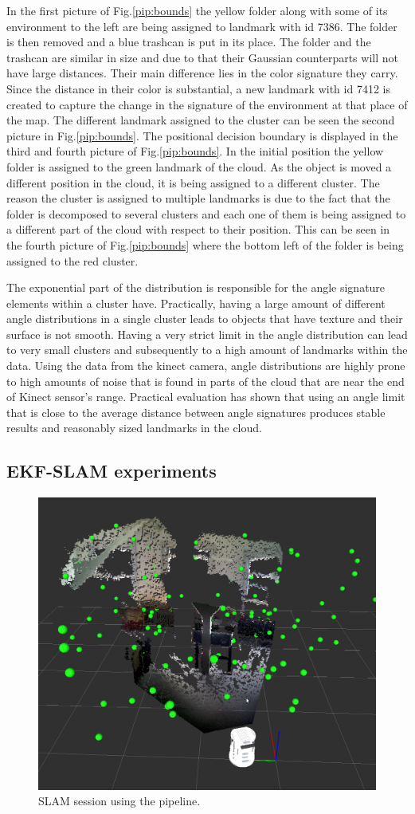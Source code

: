 \documentclass[twoside,hidelinks]{article}
\begin{document}
In the first picture of Fig.\ref{pip:bounds} the yellow folder along with some of its environment to the left are being assigned to landmark with id 7386. The folder is then removed and a blue trashcan is put in its place. The folder and the trashcan are similar in size and due to that their Gaussian counterparts will not have large distances. Their main difference lies in the color signature they carry. Since the distance in their color is substantial, a new landmark with id 7412 is created to capture the change in the signature of the environment at that place of the map. The different landmark assigned to the cluster can be seen the second picture in Fig.\ref{pip:bounds}. The positional decision boundary is displayed in the third and fourth picture of Fig.\ref{pip:bounds}. In the initial position the yellow folder is assigned to the green landmark of the cloud. As the object is moved a different position in the cloud, it is being assigned to a different cluster. The reason the cluster is assigned to multiple landmarks is due to the fact that the folder is decomposed to several clusters and each one of them is being assigned to a different part of the cloud with respect to their position. This can be seen in the fourth picture of Fig.\ref{pip:bounds} where the bottom left of the folder is being assigned to the red cluster.

The exponential part of the distribution is responsible for the angle signature elements within a cluster have. Practically, having a large amount of different angle distributions in a single cluster leads to objects that have texture and their surface is not smooth. Having a very strict limit in the angle distribution can lead to very small clusters and subsequently to a high amount of landmarks within the data. Using the data from the kinect camera, angle distributions are highly prone to high amounts of noise that is found in parts of the cloud that are near the end of Kinect sensor's range. Practical evaluation has shown that using an angle limit that is close to the average distance between angle signatures produces stable results and reasonably sized landmarks in the cloud.

\subsection{EKF-SLAM experiments}


\begin{figure}
  \centering
    \includegraphics[width=.5\textwidth]{slam110landmarks2}
    \caption{SLAM session using the pipeline.}
  \label{slam}
\end{figure}
\end{document}
